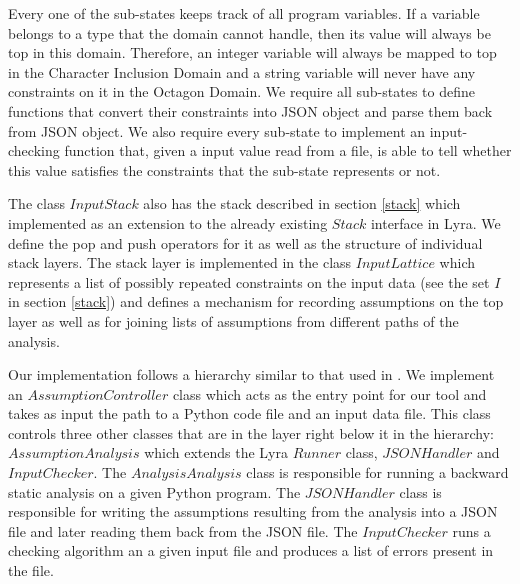 \documentclass[10pt]{report}
\begin{document}
Every one of the sub-states keeps track of all program variables. If a variable belongs to a type that the domain cannot handle, then its value will always be top in this domain. Therefore, an integer variable will always be mapped to top in the Character Inclusion Domain and a string variable will never have any constraints on it in the Octagon Domain. We require all sub-states to define functions that convert their constraints into JSON object and parse them back from JSON object. We also require every sub-state to implement an input-checking function that, given a input value read from a file, is able to tell whether this value satisfies the constraints that the sub-state represents or not. 

The class $ InputStack $ also has the stack described in section \ref{stack} which implemented as an extension to the already existing $ Stack $ interface in Lyra. We define the pop and push operators for it as well as the structure of individual stack layers. The stack layer is implemented in the class $ InputLattice $ which represents a list of possibly repeated constraints on the input data (see the set $ I $ in section \ref{stack}) and defines a mechanism for recording assumptions on the top layer as well as for joining lists of assumptions from different paths of the analysis. 

Our implementation follows a hierarchy similar to that used in \cite{madelin}. We implement an $ AssumptionController $ class which acts as the entry point for our tool and takes as input the path to a Python code file and an input data file. This class controls three other classes that are in the layer right below it in the hierarchy: $ AssumptionAnalysis $ which extends the Lyra $ Runner  $ class, $ JSONHandler $ and $ InputChecker $. The $ AnalysisAnalysis $ class is responsible for running a backward static analysis on a given Python program. The $ JSONHandler $ class is responsible for writing the assumptions resulting from the analysis into a JSON file and later reading them back from the JSON file. The $ InputChecker $ runs a checking algorithm an a given input file and produces a list of errors present in the file. 
\end{document}
